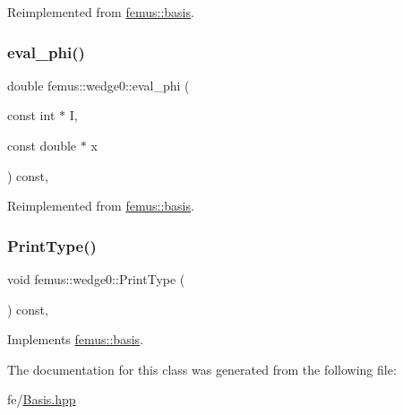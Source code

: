 Reimplemented from \mbox{\hyperlink{classfemus_1_1basis_affd9927f6e25e264108219d862b8cb3d}{femus\+::basis}}.

\mbox{\label{classfemus_1_1wedge0_a8ef4bce6068f2c45e922dea7ee104121}} 
\subsubsection{\texorpdfstring{eval\+\_\+phi()}{eval\_phi()}}
{\footnotesize\ttfamily double femus\+::wedge0\+::eval\+\_\+phi (\begin{DoxyParamCaption}\item[{const int $\ast$}]{I,  }\item[{const double $\ast$}]{x }\end{DoxyParamCaption}) const\hspace{0.3cm}{\ttfamily [inline]}, {\ttfamily [virtual]}}



Reimplemented from \mbox{\hyperlink{classfemus_1_1basis_a89b0797cdccffae5ff6d059b32016ae5}{femus\+::basis}}.

\mbox{\label{classfemus_1_1wedge0_a83944aac1c4b6b97d8fd980c5a68f4d3}} 
\subsubsection{\texorpdfstring{Print\+Type()}{PrintType()}}
{\footnotesize\ttfamily void femus\+::wedge0\+::\+Print\+Type (\begin{DoxyParamCaption}{ }\end{DoxyParamCaption}) const\hspace{0.3cm}{\ttfamily [inline]}, {\ttfamily [virtual]}}



Implements \mbox{\hyperlink{classfemus_1_1basis_abbae7bf8f31ec5793c911bc6d4ea0572}{femus\+::basis}}.



The documentation for this class was generated from the following file\+:\begin{DoxyCompactItemize}
\item 
fe/\mbox{\hyperlink{_basis_8hpp}{Basis.\+hpp}}\end{DoxyCompactItemize}

